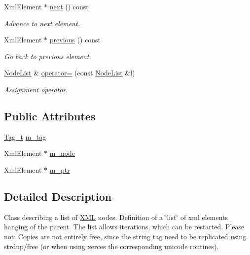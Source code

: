 \begin{DoxyCompactItemize}
XmlElement $\ast$ \hyperlink{class_d_d4hep_1_1_x_m_l_1_1_node_list_a81be6bf4c65bb7d5b74ad77d4a66d55e}{next} () const 
\begin{DoxyCompactList}\small\item\em Advance to next element. \item\end{DoxyCompactList}\item 
XmlElement $\ast$ \hyperlink{class_d_d4hep_1_1_x_m_l_1_1_node_list_aacc9959baf384d70d7e87dab17dd291e}{previous} () const 
\begin{DoxyCompactList}\small\item\em Go back to previous element. \item\end{DoxyCompactList}\item 
\hyperlink{class_d_d4hep_1_1_x_m_l_1_1_node_list}{NodeList} \& \hyperlink{class_d_d4hep_1_1_x_m_l_1_1_node_list_a4b07c12f6c886a8400c27797bc85a544}{operator=} (const \hyperlink{class_d_d4hep_1_1_x_m_l_1_1_node_list}{NodeList} \&l)
\begin{DoxyCompactList}\small\item\em Assignment operator. \item\end{DoxyCompactList}\end{DoxyCompactItemize}
\subsection*{Public Attributes}
\begin{DoxyCompactItemize}
\item 
\hyperlink{class_d_d4hep_1_1_x_m_l_1_1_tag__t}{Tag\_\-t} \hyperlink{class_d_d4hep_1_1_x_m_l_1_1_node_list_ab375956d567e51de6da40c2ddbd3724d}{m\_\-tag}
\item 
XmlElement $\ast$ \hyperlink{class_d_d4hep_1_1_x_m_l_1_1_node_list_a14d433901c24fd64952a21eb7700ec42}{m\_\-node}
\item 
XmlElement $\ast$ \hyperlink{class_d_d4hep_1_1_x_m_l_1_1_node_list_ac57599e511cd4e3d6d8643eef39839c5}{m\_\-ptr}
\end{DoxyCompactItemize}


\subsection{Detailed Description}
Class describing a list of \hyperlink{namespace_d_d4hep_1_1_x_m_l}{XML} nodes. Definition of a \char`\"{}list\char`\"{} of xml elements hanging of the parent. The list allows iterations, which can be restarted. Please not: Copies are not entirely free, since the string tag need to be replicated using strdup/free (or when using xerces the corresponding unicode routines).

